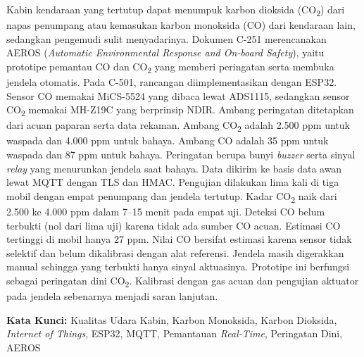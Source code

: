 \begin{onehalfspace}
Kabin kendaraan yang tertutup dapat menumpuk karbon dioksida (CO\textsubscript{2}) dari napas penumpang atau kemasukan karbon monoksida (CO) dari kendaraan lain, sedangkan pengemudi sulit menyadarinya. Dokumen C-251 merencanakan AEROS (\textit{Automatic Environmental Response and On-board Safety}), yaitu prototipe pemantau CO dan CO\textsubscript{2} yang memberi peringatan serta membuka jendela otomatis. Pada C-501, rancangan diimplementasikan dengan ESP32. Sensor CO memakai MiCS-5524 yang dibaca lewat ADS1115, sedangkan sensor CO\textsubscript{2} memakai MH-Z19C yang berprinsip NDIR. Ambang peringatan ditetapkan dari acuan paparan serta data rekaman. Ambang CO\textsubscript{2} adalah 2.500 ppm untuk waspada dan 4.000 ppm untuk bahaya. Ambang CO adalah 35 ppm untuk waspada dan 87 ppm untuk bahaya. Peringatan berupa bunyi \textit{buzzer} serta sinyal \textit{relay} yang menurunkan jendela saat bahaya. Data dikirim ke basis data awan lewat MQTT dengan TLS dan HMAC. Pengujian dilakukan lima kali di tiga mobil dengan empat penumpang dan jendela tertutup. Kadar CO\textsubscript{2} naik dari 2.500 ke 4.000 ppm dalam 7--15 menit pada empat uji.  Deteksi CO belum terbukti (nol dari lima uji) karena tidak ada sumber CO acuan. Estimasi CO tertinggi di mobil hanya 27 ppm. Nilai CO bersifat estimasi karena sensor tidak selektif dan belum dikalibrasi dengan alat referensi. Jendela masih digerakkan manual sehingga yang terbukti hanya sinyal aktuasinya. Prototipe ini berfungsi sebagai peringatan dini CO\textsubscript{2}. Kalibrasi dengan gas acuan dan pengujian aktuator pada jendela sebenarnya menjadi saran lanjutan.

\noindent \textbf{Kata Kunci:} Kualitas Udara Kabin, Karbon Monoksida, Karbon Dioksida, \textit{Internet of Things}, ESP32, MQTT, Pemantauan \textit{Real-Time}, Peringatan Dini, AEROS
\end{onehalfspace}
